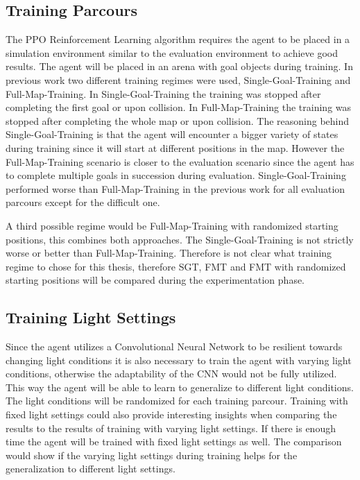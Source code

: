 \subsection*{Training Parcours}
The PPO Reinforcement Learning algorithm requires the agent to be placed in a simulation environment similar to the evaluation environment to achieve good results. The agent will be placed in an arena with goal objects during training. In previous work \autocite{maximilian} two different training regimes were used, Single-Goal-Training and Full-Map-Training. In Single-Goal-Training the training was stopped after completing the first goal or upon collision. In Full-Map-Training the training was stopped after completing the whole map or upon collision. The reasoning behind Single-Goal-Training is that the agent will encounter a bigger variety of states during training since it will start at different positions in the map. However the Full-Map-Training scenario is closer to the evaluation scenario since the agent has to complete multiple goals in succession during evaluation.
Single-Goal-Training performed worse than Full-Map-Training in the previous work \autocite{maximilian} for all evaluation parcours except for the difficult one.

A third possible regime would be Full-Map-Training with randomized starting positions, this combines both approaches. The Single-Goal-Training is not strictly worse or better than Full-Map-Training. Therefore is not clear what training regime to chose for this thesis, therefore SGT, FMT and FMT with randomized starting positions will be compared during the experimentation phase.

\subsection*{Training Light Settings}
Since the agent utilizes a Convolutional Neural Network to be resilient towards changing light conditions it is also necessary to train the agent with varying light conditions, otherwise the adaptability of the CNN would not be fully utilized. This way the agent will be able to learn to generalize to different light conditions. The light conditions will be randomized for each training parcour.
Training with fixed light settings could also provide interesting insights when comparing the results to the results of training with varying light settings. If there is enough time the agent will be trained with fixed light settings as well. The comparison would show if the varying light settings during training helps for the generalization to different light settings.


